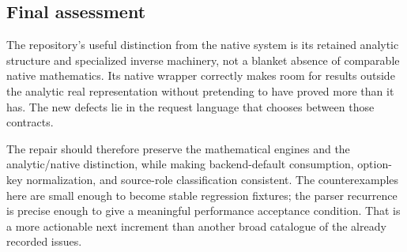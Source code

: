 \documentclass[11pt,letterpaper]{article}
\begin{document}
\subsection{Final assessment}

The repository's useful distinction from the native system is its retained
analytic structure and specialized inverse machinery, not a blanket absence
of comparable native mathematics. Its native wrapper correctly makes room
for results outside the analytic real representation without pretending to
have proved more than it has. The new defects lie in the request language
that chooses between those contracts.

The repair should therefore preserve the mathematical engines and the
analytic/native distinction, while making backend-default consumption,
option-key normalization, and source-role classification consistent. The
counterexamples here are small enough to become stable regression fixtures;
the parser recurrence is precise enough to give a meaningful performance
acceptance condition. That is a more actionable next increment than another
broad catalogue of the already recorded issues.
\end{document}
